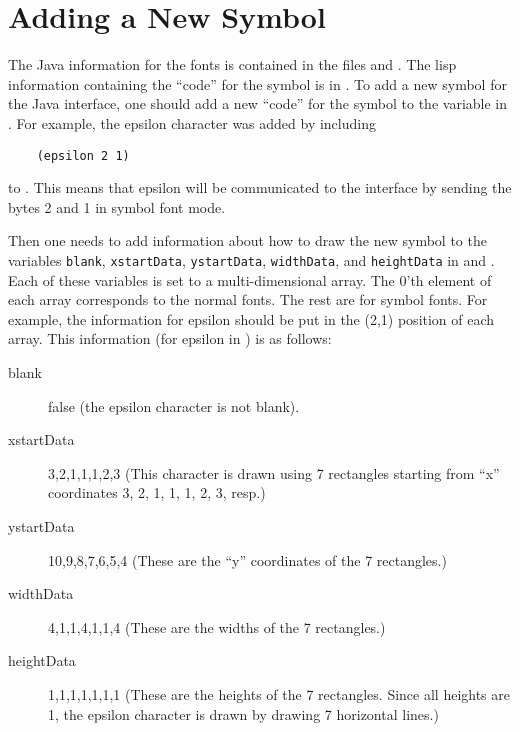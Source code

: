 \section{Adding a New Symbol}

The Java information for the fonts is contained in the files 
and .  The lisp information containing the ``code'' for
the symbol is in .
To add a new symbol for the Java interface,
one should add a new ``code'' for the symbol to the variable 
in .
For example, the epsilon character was added by including
\begin{verbatim}
    (epsilon 2 1)
\end{verbatim}
to .  This means that epsilon will be communicated
to the interface by sending the bytes 2 and 1 in symbol font mode.

Then one needs to add information about how to draw the new symbol to
the variables \verb+blank+, \verb+xstartData+, \verb+ystartData+, \verb+widthData+, 
and \verb+heightData+
in  and .
Each of these variables is set to a multi-dimensional array.
The 0'th element of each array corresponds to the normal fonts.
The rest are for symbol fonts.
For example, the information for epsilon should be put 
in the (2,1) position of each array.  This information (for epsilon
in )
is as follows:
\begin{description}
  \item[blank] false (the epsilon character is not blank).
  \item[xstartData] {3,2,1,1,1,2,3} (This character is drawn using 7 rectangles starting
    from ``x'' coordinates 3, 2, 1, 1, 1, 2, 3, resp.)
  \item[ystartData] {10,9,8,7,6,5,4} (These are the ``y'' coordinates of the 7 rectangles.)
  \item[widthData] {4,1,1,4,1,1,4} (These are the widths of the 7 rectangles.)
  \item[heightData] {1,1,1,1,1,1,1} (These are the heights of the 7 rectangles.
    Since all heights are 1, the epsilon character is drawn by drawing 7 horizontal lines.)
\end{description}






